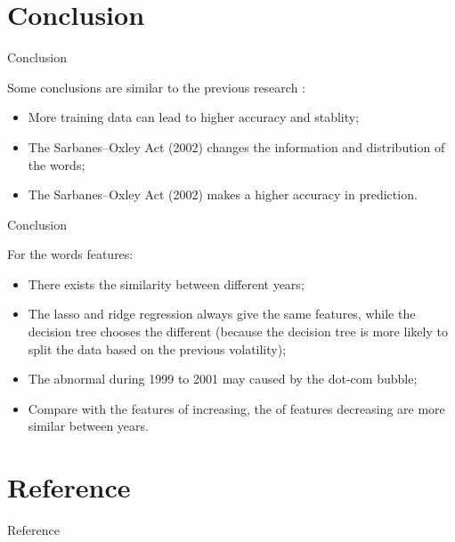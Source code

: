\documentclass{beamer}
\begin{document}
\section{Conclusion}

\begin{frame}{Conclusion}

  Some conclusions are similar to the previous research :

  \begin{itemize}
    \item More training data can lead to higher accuracy and stablity; \vspace{.25cm}
    \item The Sarbanes–Oxley Act (2002) changes the information and distribution of the words; \vspace{.25cm}
    \item The Sarbanes–Oxley Act (2002) makes a higher accuracy in prediction.
  \end{itemize}

\end{frame}

\begin{frame}{Conclusion}

  For the words features: \vspace{.25cm}

  \begin{itemize}
    \item There exists the similarity between different years; \vspace{.25cm}
    \item The lasso and ridge regression always give the same features, while the decision tree chooses the different (because the decision tree is more likely to split the data based on the previous volatility); \vspace{.25cm}
    \item The abnormal during 1999 to 2001 may caused by the dot-com bubble; \vspace{.25cm}
    \item Compare with the features of increasing, the of features decreasing are more similar between years.
  \end{itemize}

\end{frame}

\section*{Reference}
\begin{frame}[allowframebreaks]{Reference}
  \printbibliography
\end{frame}

\appendix
\end{document}
